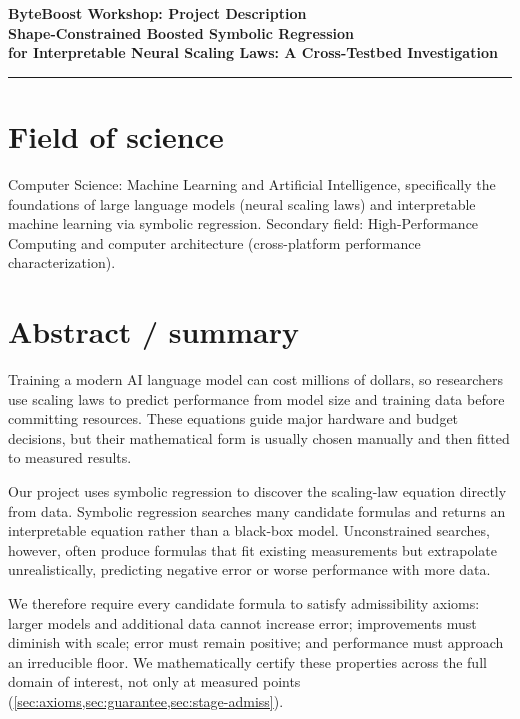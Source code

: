 \documentclass[11pt]{article}
\begin{document}

\begin{center}
 {\Large\bfseries ByteBoost Workshop: Project Description}\\[6pt]
    {\large\bfseries Shape-Constrained Boosted Symbolic Regression\\
    for Interpretable Neural Scaling Laws: A Cross-Testbed Investigation}
\end{center}

\hrule
\vspace{6pt}

\section{Field of science}\label{sec:field}
Computer Science: Machine Learning and Artificial Intelligence, specifically the foundations of large language models (neural scaling laws) and interpretable machine learning via symbolic regression. Secondary field: High-Performance Computing and computer architecture (cross-platform performance characterization).

\section{Abstract / summary}\label{sec:abstract}

Training a modern AI language model can cost millions of dollars, so researchers use scaling laws to predict performance from model size and training data before committing resources. These equations guide major hardware and budget decisions, but their mathematical form is usually chosen manually and then fitted to measured results.

Our project uses symbolic regression to discover the scaling-law equation directly from data. Symbolic regression searches many candidate formulas and returns an interpretable equation rather than a black-box model. Unconstrained searches, however, often produce formulas that fit existing measurements but extrapolate unrealistically, predicting negative error or worse performance with more data.

We therefore require every candidate formula to satisfy admissibility axioms: larger models and additional data cannot increase error; improvements must diminish with scale; error must remain positive; and performance must approach an irreducible floor. We mathematically certify these properties across the full domain of interest, not only at measured points (\cref{sec:axioms,sec:guarantee,sec:stage-admiss}).
\end{document}
